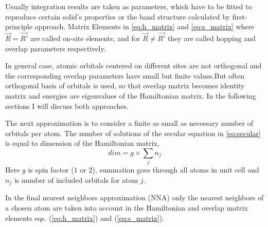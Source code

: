 Usually integration results are taken as parameters, which have to be fitted to reproduce certain solid's properties or the band structure calculated by first-principle approach. Matrix Elements in \ref{eq:h_matrix} and \ref{eq:s_matrix} where $\vec{R} = \vec{R'}$ are called on-site elements, and for $\vec{R} \neq \vec{R'}$ they are called hopping and overlap parameters respectively. 

In general case, atomic orbitals centered on different sites are not orthogonal and the corresponding overlap parameters have small but finite values.But often orthogonal basis of orbitals is used, so that overlap matrix becomes identity matrix and energies are eigenvalues of the Hamiltonian matrix. In the following sections I will discuss both approaches. 

The next approximation is to consider a finite as small as necessary number of orbitals per atom. The number of solutions of the secular equation in \ref{eq:secular} is equal to dimension of the Hamiltonian matrix,
\begin{equation}
dim = g \times \sum_j n_j
\end{equation}
Here $g$ is spin factor ($1$ or $2$), summation goes through all atoms in unit cell and $n_j$ is number of included orbitals for atom $j$.

In the final nearest neighbors approximation (NNA) only the nearest neighbors of a chosen atom are taken into account in the Hamiltonian and overlap matrix elements eqs. (\ref{eq:h_matrix}) and (\ref{eq:s_matrix}).
